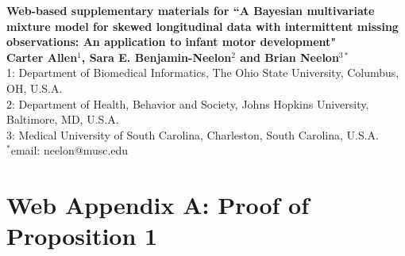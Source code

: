 \documentclass[useAMS,11pt]{article}
\newcommand{\1}{\mathbbm{1}}
\begin{document}
\begin{center}
{\bf \Large Web-based supplementary materials for ``A Bayesian multivariate mixture model for skewed longitudinal data with intermittent missing observations: An application to infant motor development"}
\\[24pt]
{\bf \large Carter Allen$^1$, Sara E. Benjamin-Neelon$^2$ and Brian Neelon$^{3*}$}\\[12pt]
1: Department of Biomedical Informatics, The Ohio State University, Columbus, OH, U.S.A. \\[12pt]
2: Department of Health, Behavior and Society, Johns Hopkins University, Baltimore, MD, U.S.A. \\[12pt]
3: Medical University of South Carolina, Charleston, South Carolina, U.S.A.\\[12pt]
$^*$email: neelon@musc.edu\\[24pt]
\end{center}

\section*{Web Appendix A: Proof of Proposition 1}
\end{document}
